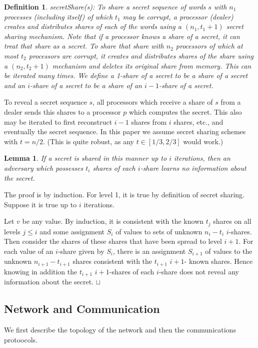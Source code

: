 \documentclass[letterpaper,11pt]{article}
\newtheorem{lemma}{Lemma}
\newtheorem{definition}{Definition}
\newcommand{\sq}{\hbox{\rlap{$\sqcap$}$\sqcup$}}
\newcommand{\qed}{\hspace*{\fill}\sq}
\newenvironment{proof}{\noindent {\bf Proof:}}{\qed\par\vskip 4mm\par}
\begin{document}
\begin{definition}
{\it secretShare(s)}:   To share a secret sequence of words $s$ with $n_1$ processes (including itself)  of which $t_1$ may be corrupt, a processor (dealer) creates and distributes shares of each of the words using a $(n_1, t_1+1)$ secret sharing mechanism. 
Note that if a processor knows a share of a secret, it can treat that share as a secret. To share that share with  $n_2$ processors of which at most $t_2$ processors are corrupt,  it creates and  distributes shares of the share
using a $(n_2, t_2+1)$ mechanism and deletes its original share from memory. This can be iterated many times.
We define a {\it 1-share} of a secret to be a share of a secret and an {\it $i$-share} of a secret to be a share of an $i-1$-share of a secret.
\end{definition}
To reveal a secret sequence $s$, all processors which receive a share of $s$ from a dealer sends this shares to a processor  $p$ which computes the secret. This also may be iterated to first reconstruct  $i-1$ shares from $i$ shares, etc.,  and eventually the secret sequence. 
In this paper we assume secret sharing schemes with $t=n/2$. (This is quite robust, as any $t \in [1/3,2/3]$ would work.)


\begin{lemma} \label{secret}  If a secret  is shared in this manner  up to $i$ iterations, then an adversary which possesses  $t_i$ shares of each $i$-share learns no information about the secret.  \end{lemma}
\begin{proof}
The proof is by induction. For level 1, it is true by definition of secret sharing.
Suppose it is true up to $i$ iterations. 

 Let $v$ be any value. By induction, it is consistent
with the  known $t_j$ shares  on all levels $j \leq i$ and some assignment $S_i$ of values to sets of unknown $n_i-t_{i}$ $i$-shares. Then
consider the shares of these shares that have been spread to level $i+1$.  For each  value of an $i$-share given by $S_i$,  there is an assignment $S_{i+1}$ of values to the unknown  $n_{i+1}-t_{i+1}$ shares  consistent with the $t_{i+1}$ $i+1$- known shares.  Hence knowing in addition the
$t_{i+1}$ $i+1$-shares of each
$i$-share does not reveal any information about  the secret. 
\end{proof}





\subsection{Network and Communication}\label{network}
We first describe the topology of the network and then the communications protoocols. 
\end{document}
